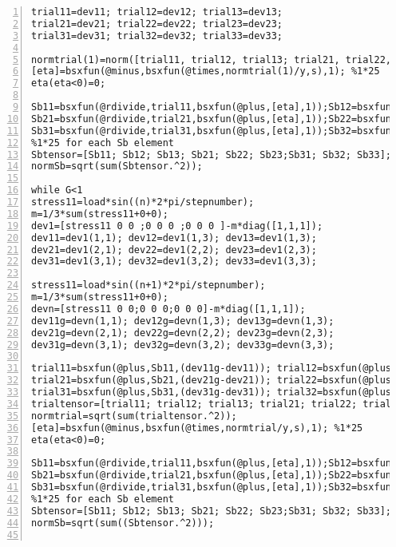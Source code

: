 \begin{lstlisting}[numbers=left, numberstyle=\tiny, keywordstyle=\color{blue!100}, commentstyle=\color{red!30!green!100!blue!100}, frame=shadowbox, rulesepcolor=\color{red!20!green!20!blue!20}]
trial11=dev11; trial12=dev12; trial13=dev13;
trial21=dev21; trial22=dev22; trial23=dev23;
trial31=dev31; trial32=dev32; trial33=dev33;

normtrial(1)=norm([trial11, trial12, trial13; trial21, trial22, trial23;trial31, trial32, trial33],'fro');
[eta]=bsxfun(@minus,bsxfun(@times,normtrial(1)/y,s),1); %1*25
eta(eta<0)=0;

Sb11=bsxfun(@rdivide,trial11,bsxfun(@plus,[eta],1));Sb12=bsxfun(@rdivide,trial12,bsxfun(@plus,[eta],1));Sb13=bsxfun(@rdivide,trial13,bsxfun(@plus,[eta],1));
Sb21=bsxfun(@rdivide,trial21,bsxfun(@plus,[eta],1));Sb22=bsxfun(@rdivide,trial22,bsxfun(@plus,[eta],1));Sb23=bsxfun(@rdivide,trial23,bsxfun(@plus,[eta],1));
Sb31=bsxfun(@rdivide,trial31,bsxfun(@plus,[eta],1));Sb32=bsxfun(@rdivide,trial32,bsxfun(@plus,[eta],1));Sb33=bsxfun(@rdivide,trial33,bsxfun(@plus,[eta],1));
%1*25 for each Sb element
Sbtensor=[Sb11; Sb12; Sb13; Sb21; Sb22; Sb23;Sb31; Sb32; Sb33];
normSb=sqrt(sum(Sbtensor.^2));

while G<1
stress11=load*sin((n)*2*pi/stepnumber);
m=1/3*sum(stress11+0+0);
dev1=[stress11 0 0 ;0 0 0 ;0 0 0 ]-m*diag([1,1,1]);
dev11=dev1(1,1); dev12=dev1(1,3); dev13=dev1(1,3);
dev21=dev1(2,1); dev22=dev1(2,2); dev23=dev1(2,3);
dev31=dev1(3,1); dev32=dev1(3,2); dev33=dev1(3,3);

stress11=load*sin((n+1)*2*pi/stepnumber);
m=1/3*sum(stress11+0+0);
devn=[stress11 0 0;0 0 0;0 0 0]-m*diag([1,1,1]);
dev11g=devn(1,1); dev12g=devn(1,3); dev13g=devn(1,3);
dev21g=devn(2,1); dev22g=devn(2,2); dev23g=devn(2,3);
dev31g=devn(3,1); dev32g=devn(3,2); dev33g=devn(3,3);

trial11=bsxfun(@plus,Sb11,(dev11g-dev11)); trial12=bsxfun(@plus,Sb12,(dev12g-dev12));trial13=bsxfun(@plus,Sb13,(dev13g-dev13));
trial21=bsxfun(@plus,Sb21,(dev21g-dev21)); trial22=bsxfun(@plus,Sb22,(dev22g-dev22));trial23=bsxfun(@plus,Sb23,(dev23g-dev23));    
trial31=bsxfun(@plus,Sb31,(dev31g-dev31)); trial32=bsxfun(@plus,Sb32,(dev32g-dev32));trial33=bsxfun(@plus,Sb33,(dev33g-dev33));
trialtensor=[trial11; trial12; trial13; trial21; trial22; trial23;trial31; trial32; trial33];
normtrial=sqrt(sum(trialtensor.^2));
[eta]=bsxfun(@minus,bsxfun(@times,normtrial/y,s),1); %1*25
eta(eta<0)=0;

Sb11=bsxfun(@rdivide,trial11,bsxfun(@plus,[eta],1));Sb12=bsxfun(@rdivide,trial12,bsxfun(@plus,[eta],1));Sb13=bsxfun(@rdivide,trial13,bsxfun(@plus,[eta],1));
Sb21=bsxfun(@rdivide,trial21,bsxfun(@plus,[eta],1));Sb22=bsxfun(@rdivide,trial22,bsxfun(@plus,[eta],1));Sb23=bsxfun(@rdivide,trial23,bsxfun(@plus,[eta],1));
Sb31=bsxfun(@rdivide,trial31,bsxfun(@plus,[eta],1));Sb32=bsxfun(@rdivide,trial32,bsxfun(@plus,[eta],1));Sb33=bsxfun(@rdivide,trial33,bsxfun(@plus,[eta],1));
%1*25 for each Sb element
Sbtensor=[Sb11; Sb12; Sb13; Sb21; Sb22; Sb23;Sb31; Sb32; Sb33];
normSb=sqrt(sum((Sbtensor.^2)));


\end{lstlisting}
